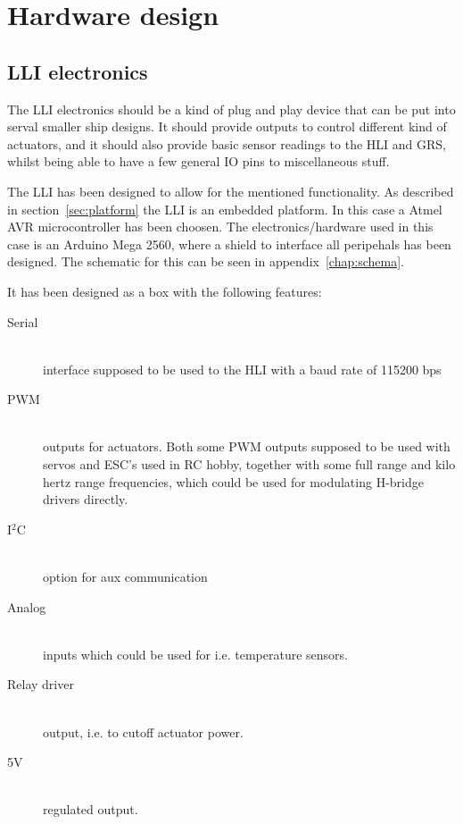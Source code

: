 \chapter{Hardware design}

\section{LLI electronics}
The \ac{LLI} electronics should be a kind of plug and play device that can be put into serval smaller ship designs. It should provide outputs to control different kind of actuators, and it should also provide basic sensor readings to the \ac{HLI} and \ac{GRS}, whilst being able to have a few general IO pins to miscellaneous stuff.

The \ac{LLI} has been designed to allow for the mentioned functionality. As described in section~\vref{sec:platform} the \ac{LLI} is an embedded platform. In this case a Atmel AVR microcontroller has been choosen. The electronics/hardware used in this case is an Arduino Mega 2560, where a shield to interface all peripehals has been designed. The schematic for this can be seen in appendix~\vref{chap:schema}.

It has been designed as a box with the following features:
\begin{description}
\item[Serial]\hfill \\ interface supposed to be used to the \ac{HLI} with a baud rate of 115200 bps
\item[PWM]\hfill \\ outputs for actuators. Both some PWM outputs supposed to be used with servos and \ac{ESC}'s used in RC hobby, together with some full range and kilo hertz range frequencies, which could be used for modulating H-bridge drivers directly.
\item[I$^2$C]\hfill \\ option for aux communication 
\item[Analog]\hfill \\ inputs which could be used for i.e. temperature sensors.
\item[Relay driver]\hfill \\ output, i.e. to cutoff actuator power.
\item[5V]\hfill \\ regulated output.
\end{description}

